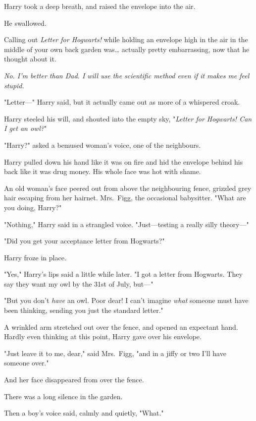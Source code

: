 Harry took a deep breath, and raised the envelope into the air.

He swallowed.

Calling out \emph{Letter for Hogwarts!} while holding an envelope high in the 
air in the middle of your own back garden was{\ldots} actually pretty 
embarrassing, now that he thought about it.

\emph{No. I'm better than Dad. I will use the scientific method even if it 
makes me feel stupid.}

"Letter---" Harry said, but it actually came out as more of a whispered croak.

Harry steeled his will, and shouted into the empty sky, "\emph{Letter for 
Hogwarts! Can I get an owl?}"

"Harry?" asked a bemused woman's voice, one of the neighbours.

Harry pulled down his hand like it was on fire and hid the envelope behind his 
back like it was drug money. His whole face was hot with shame.

An old woman's face peered out from above the neighbouring fence, grizzled grey 
hair escaping from her hairnet. Mrs.~Figg, the occasional babysitter. "What are 
you doing, Harry?"

"Nothing," Harry said in a strangled voice. "Just---testing a really silly 
theory---"

"Did you get your acceptance letter from Hogwarts?"

Harry froze in place\emph{.}

"Yes," Harry's lips said a little while later. "I got a letter from Hogwarts. 
They say they want my owl by the 31st of July, but---"

"But you don't \emph{have} an owl. Poor dear! I can't imagine \emph{what} 
someone must have been thinking, sending you just the standard letter."

A wrinkled arm stretched out over the fence, and opened an expectant hand. 
Hardly even thinking at this point, Harry gave over his envelope.

"Just leave it to me, dear," said Mrs.~Figg, "and in a jiffy or two I'll have 
someone over."

And her face disappeared from over the fence.

There was a long silence in the garden.

Then a boy's voice said, calmly and quietly, "What."